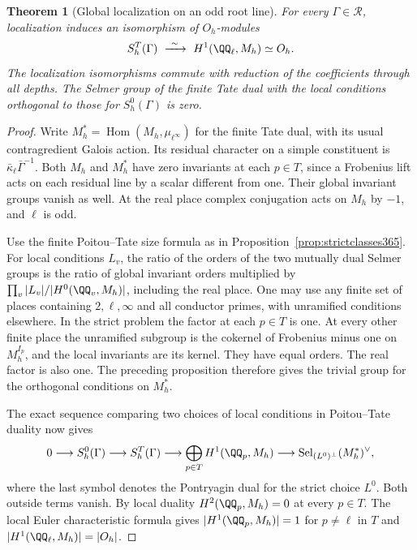 \documentclass[a4paper,11pt]{article}
\newtheorem{theorem}[proposition]{Theorem}
\theoremstyle{definition}
\theoremstyle{remark}
\numberwithin{equation}{section}
\begin{document}
\begin{theorem}[Global localization on an odd root line]\leavevmode
\label{thm:oddrootlocalization430}
For every \(\Gamma\in\mathcal R\), localization induces an
isomorphism of \(O_h\)-modules
\[
              S_h^T(\Gamma)\ \xrightarrow{\ \sim\ }\
                  H^1(\QQ_\ell,M_h)\simeq O_h .
\]
The localization isomorphisms commute with reduction of the
coefficients through all depths. The Selmer group of the finite
Tate dual with the local conditions orthogonal to those for
\(S_h^0(\Gamma)\) is zero.
\end{theorem}
\begin{proof}
Write \(M_h^*=\operatorname{Hom}(M_h,\mu_{\ell^\infty})\) for
the finite Tate dual, with its usual contragredient Galois
action. Its residual character on a simple constituent is
\(\bar\kappa_\ell\bar\Gamma^{-1}\). Both \(M_h\) and \(M_h^*\)
have zero invariants at each \(p\in T\), since a Frobenius
lift acts on each residual line by a scalar different from
one. Their global invariant groups vanish as well. At the real
place complex conjugation acts on \(M_h\) by \(-1\), and
\(\ell\) is odd.

Use the finite Poitou--Tate size formula as in
Proposition~\ref{prop:strictclasses365}. For local conditions
\(L_v\), the ratio of the orders of the two mutually dual
Selmer groups is the ratio of global invariant orders multiplied
by \(\prod_v |L_v|/|H^0(\QQ_v,M_h)|\), including the real
place. One may use any finite set of places containing
\(2,\ell,\infty\) and all conductor primes, with unramified
conditions elsewhere. In the strict problem the factor at
each \(p\in T\) is one. At every other finite place the
unramified subgroup is the cokernel of Frobenius minus one
on \(M_h^{I_p}\), and the local invariants are its kernel.
They have equal orders. The real factor is also one. The
preceding proposition therefore gives the trivial group for
the orthogonal conditions on \(M_h^*\).

The exact sequence comparing two choices of local conditions
in Poitou--Tate duality now gives
\[
 0\longrightarrow S_h^0(\Gamma)\longrightarrow S_h^T(\Gamma)
   \longrightarrow \bigoplus_{p\in T}H^1(\QQ_p,M_h)
   \longrightarrow
      \operatorname{Sel}_{(L^0)^\perp}(M_h^*)^\vee ,
\]
where the last symbol denotes the Pontryagin dual for the
strict choice \(L^0\). Both outside terms vanish. By local
duality \(H^2(\QQ_p,M_h)=0\) at every \(p\in T\).
The local Euler characteristic formula gives
\(|H^1(\QQ_p,M_h)|=1\) for \(p\ne\ell\) in \(T\) and
\(|H^1(\QQ_\ell,M_h)|=|O_h|\).


\end{proof}
\end{document}
